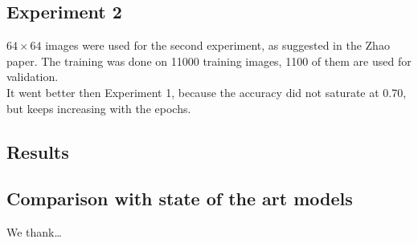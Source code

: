 \documentclass[twocolumn,showpacs,%
  nofootinbib,aps,superscriptaddress,%
  eqsecnum,prd,notitlepage,showkeys,10pt]{revtex4-1}
\begin{document}
\subsection{Experiment 2}
$64\times64$ images were used for the second experiment, as suggested in the Zhao paper. The training was done on 11000 training images, 1100 of them are used for validation.\\
It went better then Experiment 1, because the accuracy did not saturate at 0.70, but keeps increasing with the epochs.

\subsection{Results}


\subsection{Comparison with state of the art models}

\begin{acknowledgments}

We thank\dots

\end{acknowledgments}
\end{document}
